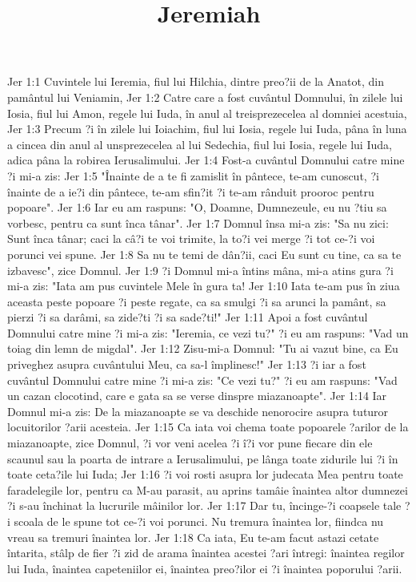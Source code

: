 

\title{Jeremiah}

Jer 1:1  Cuvintele lui Ieremia, fiul lui Hilchia, dintre preo?ii de la Anatot, din pamântul lui Veniamin,
Jer 1:2  Catre care a fost cuvântul Domnului, în zilele lui Iosia, fiul lui Amon, regele lui Iuda, în anul al treisprezecelea al domniei acestuia,
Jer 1:3  Precum ?i în zilele lui Ioiachim, fiul lui Iosia, regele lui Iuda, pâna în luna a cincea din anul al unsprezecelea al lui Sedechia, fiul lui Iosia, regele lui Iuda, adica pâna la robirea Ierusalimului.
Jer 1:4  Fost-a cuvântul Domnului catre mine ?i mi-a zis:
Jer 1:5  "Înainte de a te fi zamislit în pântece, te-am cunoscut, ?i înainte de a ie?i din pântece, te-am sfin?it ?i te-am rânduit prooroc pentru popoare".
Jer 1:6  Iar eu am raspuns: "O, Doamne, Dumnezeule, eu nu ?tiu sa vorbesc, pentru ca sunt înca tânar".
Jer 1:7  Domnul însa mi-a zis: "Sa nu zici: Sunt înca tânar; caci la câ?i te voi trimite, la to?i vei merge ?i tot ce-?i voi porunci vei spune.
Jer 1:8  Sa nu te temi de dân?ii, caci Eu sunt cu tine, ca sa te izbavesc", zice Domnul.
Jer 1:9  ?i Domnul mi-a întins mâna, mi-a atins gura ?i mi-a zis: "Iata am pus cuvintele Mele în gura ta!
Jer 1:10  Iata te-am pus în ziua aceasta peste popoare ?i peste regate, ca sa smulgi ?i sa arunci la pamânt, sa pierzi ?i sa darâmi, sa zide?ti ?i sa sade?ti!"
Jer 1:11  Apoi a fost cuvântul Domnului catre mine ?i mi-a zis: "Ieremia, ce vezi tu?" ?i eu am raspuns: "Vad un toiag din lemn de migdal".
Jer 1:12  Zisu-mi-a Domnul: "Tu ai vazut bine, ca Eu priveghez asupra cuvântului Meu, ca sa-l împlinesc!"
Jer 1:13  ?i iar a fost cuvântul Domnului catre mine ?i mi-a zis: "Ce vezi tu?" ?i eu am raspuns: "Vad un cazan clocotind, care e gata sa se verse dinspre miazanoapte".
Jer 1:14  Iar Domnul mi-a zis: De la miazanoapte se va deschide nenorocire asupra tuturor locuitorilor ?arii acesteia.
Jer 1:15  Ca iata voi chema toate popoarele ?arilor de la miazanoapte, zice Domnul, ?i vor veni acelea ?i î?i vor pune fiecare din ele scaunul sau la poarta de intrare a Ierusalimului, pe lânga toate zidurile lui ?i în toate ceta?ile lui Iuda;
Jer 1:16  ?i voi rosti asupra lor judecata Mea pentru toate faradelegile lor, pentru ca M-au parasit, au aprins tamâie înaintea altor dumnezei ?i s-au închinat la lucrurile mâinilor lor.
Jer 1:17  Dar tu, încinge-?i coapsele tale ?i scoala de le spune tot ce-?i voi porunci. Nu tremura înaintea lor, fiindca nu vreau sa tremuri înaintea lor.
Jer 1:18  Ca iata, Eu te-am facut astazi cetate întarita, stâlp de fier ?i zid de arama înaintea acestei ?ari întregi: înaintea regilor lui Iuda, înaintea capeteniilor ei, înaintea preo?ilor ei ?i înaintea poporului ?arii.
